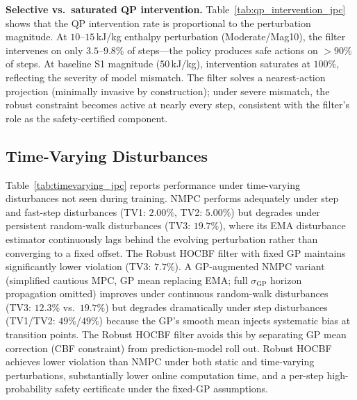 \textbf{Selective vs.\ saturated QP intervention.} Table~\ref{tab:qp_intervention_jpc} shows that the QP intervention rate is proportional to the perturbation magnitude. At $10$--$15$\,kJ/kg enthalpy perturbation (Moderate/Mag10), the filter intervenes on only $3.5$--$9.8\%$ of steps---the policy produces safe actions on $>90\%$ of steps. At baseline S1 magnitude ($50$\,kJ/kg), intervention saturates at $100\%$, reflecting the severity of model mismatch. The filter solves a nearest-action projection (minimally invasive by construction); under severe mismatch, the robust constraint becomes active at nearly every step, consistent with the filter's role as the safety-certified component.

\begin{table}[htbp]
    \centering
    \caption{QP Intervention Rate (\%) vs.\ Perturbation Magnitude (PPO-RHOCBF, $\epsilonKappa=1.0$, 3 seeds).}
    \label{tab:qp_intervention_jpc}
    \footnotesize
\end{table}

\subsection{Time-Varying Disturbances}

Table~\ref{tab:timevarying_jpc} reports performance under time-varying disturbances not seen during training. NMPC performs adequately under step and fast-step disturbances (TV1: $2.00\%$, TV2: $5.00\%$) but degrades under persistent random-walk disturbances (TV3: $19.7\%$), where its EMA disturbance estimator continuously lags behind the evolving perturbation rather than converging to a fixed offset. The Robust HOCBF filter with fixed GP maintains significantly lower violation (TV3: $7.7\%$). A GP-augmented NMPC variant (simplified cautious MPC, GP mean replacing EMA; full $\sigma_{\mathrm{GP}}$ horizon propagation omitted) improves under continuous random-walk disturbances (TV3: $12.3\%$ vs.\ $19.7\%$) but degrades dramatically under step disturbances (TV1/TV2: $49\%$/$49\%$) because the GP's smooth mean injects systematic bias at transition points. The Robust HOCBF filter avoids this by separating GP mean correction (CBF constraint) from prediction-model roll out. Robust HOCBF achieves lower violation than NMPC under both static and time-varying perturbations, substantially lower online computation time, and a per-step high-probability safety certificate under the fixed-GP assumptions.

